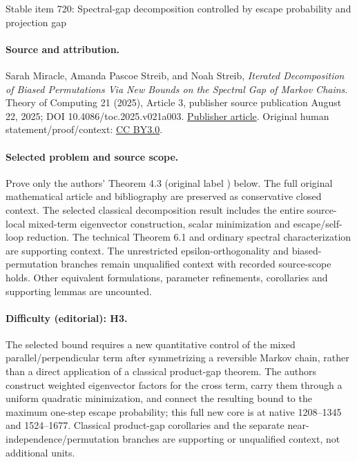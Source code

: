 \documentclass[11pt]{article}
\numberwithin{equation}{section}
\theoremstyle{definition}
\theoremstyle{plain}
\begin{document}
\begin{center}{\Large Stable item 720: Spectral-gap decomposition controlled by escape probability and projection gap}\end{center}
\paragraph{Source and attribution.}
Sarah Miracle, Amanda Pascoe Streib, and Noah Streib, \emph{Iterated Decomposition of Biased Permutations Via New Bounds on the Spectral Gap of Markov Chains}. Theory of Computing 21 (2025), Article 3, publisher source publication August 22, 2025; DOI 10.4086/toc.2025.v021a003. \href{https://theoryofcomputing.org/articles/v021a003/}{Publisher article}. Original human statement/proof/context: \href{https://creativecommons.org/licenses/by/3.0/}{CC BY3.0}.
\paragraph{Selected problem and source scope.}
Prove only the authors' Theorem 4.3 (original label ) below. The full original mathematical article and bibliography are preserved as conservative closed context. The selected classical decomposition result includes the entire source-local mixed-term eigenvector construction, scalar minimization and escape/self-loop reduction. The technical Theorem 6.1 and ordinary spectral characterization are supporting context. The unrestricted epsilon-orthogonality and biased-permutation branches remain unqualified context with recorded source-scope holds. Other equivalent formulations, parameter refinements, corollaries and supporting lemmas are uncounted.
\paragraph{Difficulty (editorial): H3.}
The selected bound requires a new quantitative control of the mixed parallel/perpendicular term after symmetrizing a reversible Markov chain, rather than a direct application of a classical product-gap theorem. The authors construct weighted eigenvector factors for the cross term, carry them through a uniform quadratic minimization, and connect the resulting bound to the maximum one-step escape probability; this full new core is at native 1208–1345 and 1524–1677. Classical product-gap corollaries and the separate near-independence/permutation branches are supporting or unqualified context, not additional units.
\end{document}
